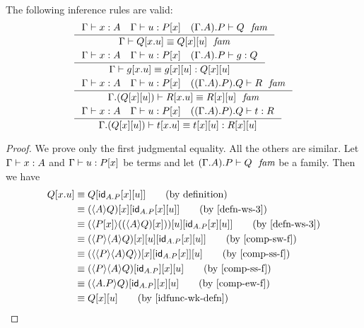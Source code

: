 \begin{lem}
The following inference rules are valid:
\begin{align*}
& \inference
  {\jterm{\Gamma}{A}{x}
   \jterm{\Gamma}{\subst{x}{P}}{u}
   \jfam{{{\Gamma}{A}}{P}}{Q}}
  {\jfameq{\Gamma}{\subst{\tmext{A}{P}{x}{u}}{Q}}{\subst{u}{{x}{Q}}}}\\
& \inference
  {\jterm{\Gamma}{A}{x}
   \jterm{\Gamma}{\subst{x}{P}}{u}
   \jterm{{{\Gamma}{A}}{P}}{Q}{g}}
  {\jtermeq{\Gamma}{\subst{u}{{x}{Q}}}{\subst{\tmext{A}{P}{x}{u}}{g}}{\subst{u}{{x}{g}}}}\\
& \inference
  {\jterm{\Gamma}{A}{x}
   \jterm{\Gamma}{\subst{x}{P}}{u}
   \jfam{{{{\Gamma}{A}}{P}}{Q}}{R}}
  {\jfameq{{\Gamma}{\subst{u}{{x}{Q}}}}{\subst{\tmext{A}{P}{x}{u}}{R}}{\subst{u}{{x}{R}}}}\\
& \inference
  {\jterm{\Gamma}{A}{x}
   \jterm{\Gamma}{\subst{x}{P}}{u}
   \jterm{{{{\Gamma}{A}}{P}}{Q}}{R}{t}}
  {\jtermeq{{\Gamma}{\subst{u}{{x}{Q}}}}{\subst{u}{{x}{R}}}{\subst{\tmext{A}{P}{x}{u}}{t}}{\subst{u}{{x}{t}}}}
\end{align*}
\end{lem}

\begin{proof}
We prove only the first judgmental equality. All the others are similar.
Let $\jterm{\Gamma}{A}{x}$ and $\jterm{\Gamma}{\subst{x}{P}}{u}$
be terms and let $\jfam{{{\Gamma}{A}}{P}}{Q}$ be a family. Then we have
\begin{align*}
\subst{\tmext{A}{P}{x}{u}}{Q} 
& \jdeq \subst{{u}{{x}{\idfunc[\ctxext{A}{P}]}}}{Q} \tag{by definition}\\
& \jdeq \subst{{u}{{x}{\idfunc[\ctxext{A}{P}]}}}{{x}{\ctxwk{A}{Q}}}\tag{by \autoref{defn-ws-3}}\\
& \jdeq \subst{{u}{{x}{\idfunc[\ctxext{A}{P}]}}}{{u}{\ctxwk{\subst{x}{P}}{\subst{x}{\ctxwk{A}{Q}}}}}\tag{by \autoref{defn-ws-3}}\\
& \jdeq \subst{{u}{{x}{\idfunc[\ctxext{A}{P}]}}}{{u}{{x}{\ctxwk{P}{{A}{Q}}}}}\tag{by \autoref{comp-sw-f}}\\
& \jdeq \subst{u}{{{x}{\idfunc[\ctxext{A}{P}]}}{{x}{\ctxwk{{P}{{A}{Q}}}}}}\tag{by \autoref{comp-ss-f}}\\
& \jdeq \subst{u}{{x}{{\idfunc[\ctxext{A}{P}]}{\ctxwk{P}{{A}{Q}}}}}\tag{by \autoref{comp-ss-f}}\\
& \jdeq \subst{u}{{x}{{\idfunc[\ctxext{A}{P}]}{\ctxwk{\ctxext{A}{P}}{Q}}}}\tag{by \autoref{comp-ew-f}}\\
& \jdeq \subst{u}{{x}{Q}}\tag{by \autoref{idfunc-wk-defn}}
\end{align*}
\end{proof}

